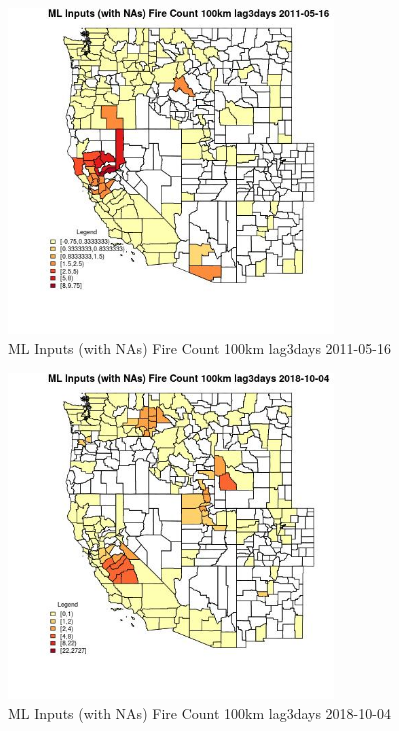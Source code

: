 \begin{figure} 
\centering  
\includegraphics[width=0.77\textwidth]{Code_Outputs/Report_ML_input_PM25_Step4_part_f_de_duplicated_aveswNAs_CountyFire_Count_100km_lag3daysMean2011-05-16.jpg} 
\caption{\label{fig:Report_ML_input_PM25_Step4_part_f_de_duplicated_aveswNAsCountyFire_Count_100km_lag3daysMean2011-05-16}ML Inputs (with NAs) Fire Count 100km lag3days 2011-05-16} 
\end{figure} 
 

\begin{figure} 
\centering  
\includegraphics[width=0.77\textwidth]{Code_Outputs/Report_ML_input_PM25_Step4_part_f_de_duplicated_aveswNAs_CountyFire_Count_100km_lag3daysMean2018-10-04.jpg} 
\caption{\label{fig:Report_ML_input_PM25_Step4_part_f_de_duplicated_aveswNAsCountyFire_Count_100km_lag3daysMean2018-10-04}ML Inputs (with NAs) Fire Count 100km lag3days 2018-10-04} 
\end{figure} 
 


